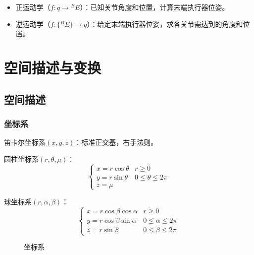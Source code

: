 \documentclass[
12pt, %
a4paper, 
oneside, %
headinclude,footinclude, %
]{scrartcl}
\begin{document}
\begin{itemize}
\item 正运动学（$ f:q \rightarrow {}^B E $）：已知关节角度和位置，计算末端执行器位姿。
\item 逆运动学（$ f:\{{}^B E\} \rightarrow q $）：给定末端执行器位姿，求各关节需达到的角度和位置。
\end{itemize}
\section{空间描述与变换}
\subsection[空间描述]{空间描述}
\subsubsection[坐标系]{坐标系}
\begin{itemize}
\item 笛卡尔坐标系$ (x, y, z) $：标准正交基，右手法则。 \\
\begin{minipage}{0.5\textwidth}
\item 圆柱坐标系$ (r, \theta, \mu) $：
$$ \begin{cases} x = r \cos\theta &r \geq 0 \\ y = r \sin\theta &0 \leq \theta \leq 2 \pi \\ z = \mu \end{cases} $$
\end{minipage}
\begin{minipage}{0.5\textwidth}
\item 球坐标系$ (r, \alpha, \beta) $：
$$ \begin{cases} x = r \cos\beta \cos\alpha &r \geq 0 \\ y = r \cos\beta \sin\alpha &0 \leq \alpha \leq 2\pi \\ z = r \sin\beta &0 \leq \beta \leq 2\pi \end{cases} $$
\end{minipage}
\end{itemize}

\begin{figure}[H]
\centering
{} \quad
{} \quad
{}
\caption{坐标系}
\end{figure}
\end{document}
